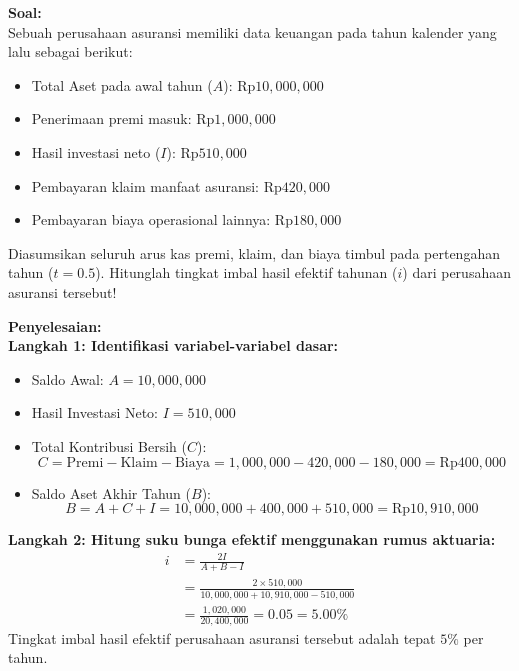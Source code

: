 \documentclass[11pt,a4paper]{article}
\begin{document}
\begin{examplebox}[Contoh 2: Perhitungan Imbal Hasil Asuransi dengan Formula $i = \frac{2I}{A+B-I}$]
\textbf{Soal:}\\
Sebuah perusahaan asuransi memiliki data keuangan pada tahun kalender yang lalu sebagai berikut:
\begin{itemize}
    \item Total Aset pada awal tahun ($A$): $\text{Rp}10{,}000{,}000$
    \item Penerimaan premi masuk: $\text{Rp}1{,}000{,}000$
    \item Hasil investasi neto ($I$): $\text{Rp}510{,}000$
    \item Pembayaran klaim manfaat asuransi: $\text{Rp}420{,}000$
    \item Pembayaran biaya operasional lainnya: $\text{Rp}180{,}000$
\end{itemize}
Diasumsikan seluruh arus kas premi, klaim, dan biaya timbul pada pertengahan tahun ($t = 0.5$). Hitunglah tingkat imbal hasil efektif tahunan ($i$) dari perusahaan asuransi tersebut!

\vspace{0.5em}
\textbf{Penyelesaian:}\\
\textbf{Langkah 1: Identifikasi variabel-variabel dasar:}
\begin{itemize}
    \item Saldo Awal: $A = 10{,}000{,}000$
    \item Hasil Investasi Neto: $I = 510{,}000$
    \item Total Kontribusi Bersih ($C$):
    \begin{equation*}
        C = \text{Premi} - \text{Klaim} - \text{Biaya} = 1{,}000{,}000 - 420{,}000 - 180{,}000 = \text{Rp}400{,}000
    \end{equation*}
    \item Saldo Aset Akhir Tahun ($B$):
    \begin{equation*}
        B = A + C + I = 10{,}000{,}000 + 400{,}000 + 510{,}000 = \text{Rp}10{,}910{,}000
    \end{equation*}
\end{itemize}

\textbf{Langkah 2: Hitung suku bunga efektif menggunakan rumus aktuaria:}
\begin{align*}
    i &= \frac{2I}{A + B - I} \\[0.4em]
      &= \frac{2 \times 510{,}000}{10{,}000{,}000 + 10{,}910{,}000 - 510{,}000} \\[0.4em]
      &= \frac{1{,}020{,}000}{20{,}400{,}000} = 0.05 = 5.00\%
\end{align*}
Tingkat imbal hasil efektif perusahaan asuransi tersebut adalah tepat $5\%$ per tahun.
\end{examplebox}
\end{document}
